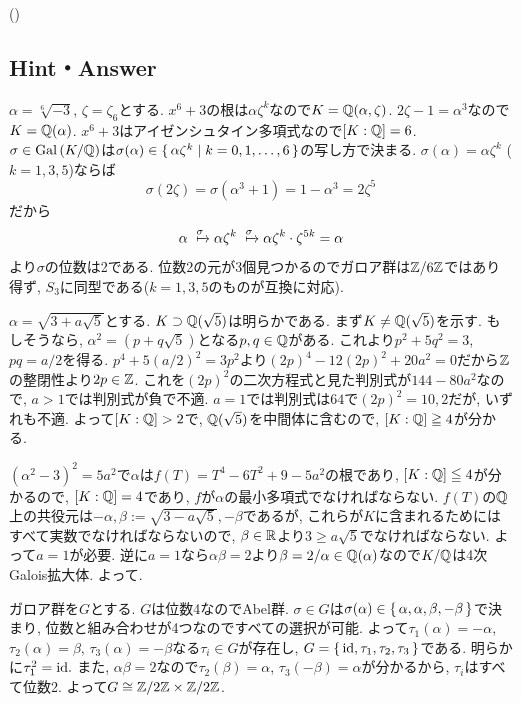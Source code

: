 \begin{prob} ()
\end{prob}


\newpage

\subsection{Hint・Answer}
{\small
\begin{probans}
$\alpha = \sqrt[6]{-3}$, $\zeta = \zeta_6$とする. $x^6 + 3$の根は$\alpha\zeta^k$なので$K=\mathbb{Q}(\alpha,\zeta)$. $2\zeta - 1 = \alpha^3$なので$K=\mathbb{Q}(\alpha)$. $x^6 + 3$はアイゼンシュタイン多項式なので$[K:\mathbb{Q}] = 6$. $\sigma\in \operatorname{Gal}{(K/\mathbb{Q})}$は$\sigma(\alpha)\in \set{\alpha\zeta^k\mid k=0,1,\dots, 6}$の写し方で決まる. $\sigma(\alpha) = \alpha\zeta^k$ ($k=1,3,5$)ならば
\[\sigma(2\zeta) = \sigma(\alpha^3 + 1) = 1-\alpha^3 = 2\zeta^5\]
だから
\[\alpha\xmapsto{\sigma} \alpha\zeta^{k} \xmapsto{\sigma}\alpha\zeta^k \cdot \zeta^{5k} = \alpha \]
より$\sigma$の位数は2である. 位数2の元が3個見つかるのでガロア群は$\mathbb{Z}/6\mathbb{Z}$ではあり得ず, $S_3$に同型である($k=1,3,5$のものが互換に対応).
\end{probans}

\begin{probans}
$\alpha = \sqrt{3+a\sqrt{5}}$とする. $K\supset \mathbb{Q}(\sqrt{5})$は明らかである. まず$K\neq \mathbb{Q}(\sqrt{5})$を示す. もしそうなら, $\alpha^2 = (p+q\sqrt{5})$となる$p,q\in\mathbb{Q}$がある. これより$p^2 + 5q^2 = 3$, $pq = a/2$を得る. $p^4 + 5(a/2)^2 = 3p^2$より$(2p)^4 -12(2p)^2 + 20a^2 = 0$だから$\mathbb{Z}$の整閉性より$2p\in \mathbb{Z}$. これを$(2p)^2$の二次方程式と見た判別式が$144- 80a^2$なので, $a>1$では判別式が負で不適. $a=1$では判別式は$64$で$(2p)^2 = 10, 2$だが, いずれも不適. よって$[K:\mathbb{Q}] > 2$で, $\mathbb{Q}(\sqrt{5})$を中間体に含むので, $[K:\mathbb{Q}]\geqq 4$が分かる. \par
$(\alpha^2 - 3)^2 = 5a^2$で$\alpha$は$f(T) = T^4 - 6T^2 + 9 -5a^2$の根であり, $[K:\mathbb{Q}]\leqq 4$が分かるので, $[K:\mathbb{Q}]=4$であり, $f$が$\alpha$の最小多項式でなければならない. $f(T)$の$\mathbb{Q}$上の共役元は$-\alpha, \beta:= \sqrt{3-a\sqrt{5}}, -\beta$であるが, これらが$K$に含まれるためにはすべて実数でなければならないので, $\beta\in \mathbb{R}$より$3 \geq a\sqrt{5}$でなければならない. よって$a=1$が必要. 逆に$a=1$なら$\alpha \beta = 2$より$\beta = 2/\alpha\in \mathbb{Q}(\alpha)$なので$K/\mathbb{Q}$は4次Galois拡大体. よって. \par
ガロア群を$G$とする. $G$は位数4なのでAbel群. $\sigma\in G$は$\sigma(\alpha)\in\set{\alpha,\-\alpha,\beta,-\beta}$で決まり, 位数と組み合わせが4つなのですべての選択が可能. よって$\tau_1(\alpha) = -\alpha$, $\tau_2(\alpha) = \beta$, $\tau_3(\alpha)=-\beta$なる$\tau_i\in G$が存在し, $G=\set{\mathrm{id},\tau_1,\tau_2,\tau_3}$である. 明らかに$\tau_1^2 = \mathrm{id}.$ また, $\alpha\beta = 2$なので$\tau_2(\beta) = \alpha$, $\tau_3(-\beta) = \alpha$が分かるから, $\tau_i$はすべて位数2. よって$G\cong \mathbb{Z}/2\mathbb{Z}\times \mathbb{Z}/2\mathbb{Z}$.
\end{probans}

}
